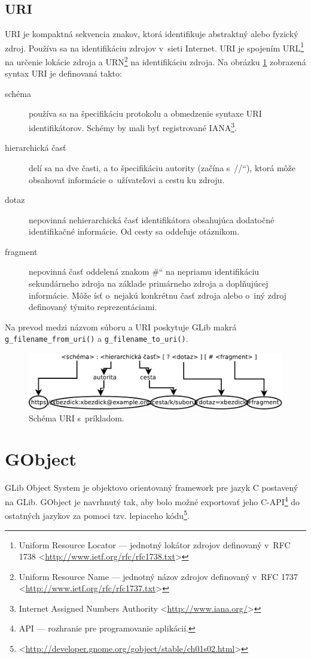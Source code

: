 \documentclass[12pt,oneside,final]{fithesis2}
\newcommand\uv[1]{\quotedblbase #1\textquotedblleft}%
\begin{document}
\subsection{URI} 
URI je kompaktná sekvencia znakov, ktorá identifikuje abstraktný alebo fyzický zdroj. Používa sa na identifikáciu zdrojov v~sieti Internet. URI je spojením URL\footnote{Uniform Resource Locator --- jednotný lokátor zdrojov definovaný v~RFC 1738 <\url{http://www.ietf.org/rfc/rfc1738.txt}>} na určenie lokácie zdroja a URN\footnote{Uniform Resource Name --- jednotný názov zdrojov definovaný v~RFC 1737 <\url{http://www.ietf.org/rfc/rfc1737.txt}>} na identifikáciu zdroja. Na obrázku \ref{obr.URI} zobrazená syntax URI je definovaná takto:
\begin{description}
\item[schéma] používa sa na špecifikáciu protokolu a obmedzenie syntaxe URI identifikátorov. Schémy by mali byť registrované IANA\footnote{Internet Assigned Numbers Authority <\url{http://www.iana.org/}>}.
\item[hierarchická časť] delí sa na dve časti, a to špecifikáciu autority (začína s~\uv{//}), ktorá môže obsahovať informácie o~užívateľovi a cestu ku zdroju.
\item[dotaz] nepovinná nehierarchická časť identifikátora obsahujúca dodatočné identifikačné informácie. Od cesty sa oddeľuje otáznikom.%
\item[fragment] nepovinná časť oddelená znakom \uv{\#} na nepriamu identifikáciu sekundárneho zdroja na základe primárneho zdroja a doplňujúcej informácie. Môže ísť o~nejakú konkrétnu časť zdroja alebo o~iný zdroj definovaný týmito reprezentáciami.
\end{description}
Na prevod medzi názvom súboru a URI poskytuje GLib makrá \texttt{g\_filename\_from\_uri()} a \texttt{g\_filename\_to\_uri()}.

\begin{figure}[hb]
\includegraphics[width=\linewidth]{Diagram1.pdf}
\caption{Schéma URI s~príkladom.}
\label{obr.URI}
\end{figure}

\section{GObject}
GLib Object System je objektovo orientovaný framework pre jazyk C postavený na GLib. GObject je navrhnutý tak, aby bolo možné exportovať jeho C-API\footnote{API --- rozhranie pre programovanie aplikácií.} do ostatných jazykov za pomoci tzv. lepiaceho kódu\footnote{<\url{http://developer.gnome.org/gobject/stable/ch01s02.html}>}.
\end{document}

